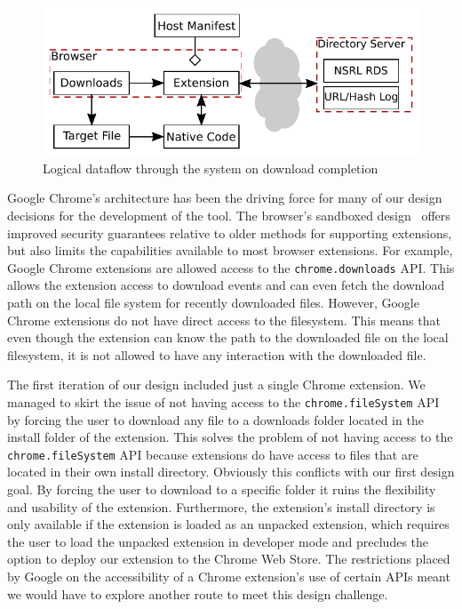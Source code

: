 \documentclass[letterpaper,twocolumn,10pt]{article}
\begin{document}
\begin{figure}
    \includegraphics[width=\textwidth]{system.pdf}
    \caption{Logical dataflow through the system on download completion}
    \label{fig:sysflow}
\end{figure}

Google Chrome's architecture has been the driving force for many of our design decisions
for the development of the tool. The browser's sandboxed design~\cite{chromium-security}
offers improved security guarantees relative to older methods for supporting extensions,
but also limits the capabilities available to most browser extensions.
For example, Google Chrome extensions are allowed access to the \texttt{chrome.downloads} API.
This allows the extension access to download events and can even fetch the download path on the
local file system for recently downloaded files. However, Google Chrome extensions do not have
direct access to the filesystem. This means that even though the extension can know
the path to the downloaded file on the local filesystem, it is not allowed to have any interaction with
the downloaded file.

The first iteration of our design included just a single Chrome extension. We managed to skirt the
issue of not having access to the \texttt{chrome.fileSystem} API by forcing the user to download
any file to a downloads folder located in the install folder of the extension. This solves the problem
of not having access to the \texttt{chrome.fileSystem} API because extensions do have access to
files that are located in their own install directory. Obviously this conflicts with our first design goal.
By forcing the user to download to a specific folder it ruins the flexibility and usability of the extension.
Furthermore, the extension’s install directory is only available if the extension is loaded as an unpacked
extension, which requires the user to load the unpacked extension in developer mode and precludes
the option to deploy our extension to the Chrome Web Store. The restrictions placed by Google on
the accessibility of a Chrome extension’s use of certain APIs meant we would have to explore another
route to meet this design challenge.
\end{document}

